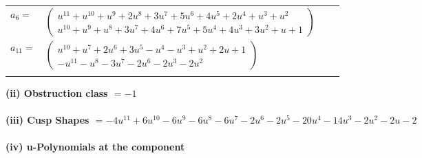 \documentclass[1p]{elsarticle_modified}
\theoremstyle{definition}
\begin{document}
\begin{tabular}{m{7pt} m{180pt} m{7pt} m{180pt} }
\flushright $a_{6}=$&$\begin{pmatrix}u^{11}+u^{10}+u^9+2 u^8+3 u^7+5 u^6+4 u^5+2 u^4+u^3+u^2\\u^{10}+u^9+u^8+3 u^7+4 u^6+7 u^5+5 u^4+4 u^3+3 u^2+u+1\end{pmatrix}$ \\
\flushright $a_{11}=$&$\begin{pmatrix}u^{10}+u^7+2 u^6+3 u^5- u^4- u^3+u^2+2 u+1\\- u^{11}- u^8-3 u^7-2 u^6-2 u^3-2 u^2\end{pmatrix}$\\&\end{tabular}
\flushleft \textbf{(ii) Obstruction class $= -1$}\\~\\
\flushleft \textbf{(iii) Cusp Shapes $= -4 u^{11}+6 u^{10}-6 u^9-6 u^8-6 u^7-2 u^6-2 u^5-20 u^4-14 u^3-2 u^2-2 u-2$}\\~\\
\newpage\renewcommand{\arraystretch}{1}
\flushleft \textbf{(iv) u-Polynomials at the component}\newline \\
\end{document}
